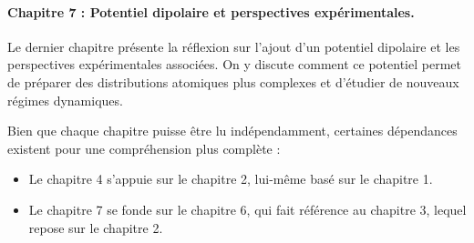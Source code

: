 \paragraph{Chapitre 7 : Potentiel dipolaire et perspectives expérimentales.}  
Le dernier chapitre présente la réflexion sur l’ajout d’un potentiel dipolaire et les perspectives expérimentales associées. On y discute comment ce potentiel permet de préparer des distributions atomiques plus complexes et d’étudier de nouveaux régimes dynamiques.

\bigskip

\noindent Bien que chaque chapitre puisse être lu indépendamment, certaines dépendances existent pour une compréhension plus complète :  
\begin{itemize}[label = $\bullet$]
    \item Le chapitre 4 s’appuie sur le chapitre 2, lui-même basé sur le chapitre 1.  
    \item Le chapitre 7 se fonde sur le chapitre 6, qui fait référence au chapitre 3, lequel repose sur le chapitre 2.  
\end{itemize}


